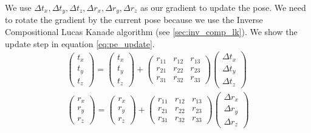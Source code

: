 \documentclass[11pt,a4paper,titlepage,oneside]{report}
\begin{document}
We use $\Delta t_x,\Delta t_y,\Delta t_z,\Delta r_x,\Delta r_y,\Delta r_z$ as our gradient to update the pose. We need to rotate the gradient by the current pose because we use the Inverse Compositional Lucas Kanade algorithm (see \ref{sec:inv_comp_lk}). We show the update step in equation \ref{eq:pe_update}.
\begin{equation}\label{eq:pe_update}
  \begin{gathered}
    \begin{pmatrix}
      t_x\\
      t_y\\
      t_z
    \end{pmatrix}=
    \begin{pmatrix}
      t_x\\
      t_y\\
      t_z
    \end{pmatrix}+
    \begin{pmatrix}
      r_{11} & r_{12} & r_{13}\\
      r_{21} & r_{22} & r_{23}\\
      r_{31} & r_{32} & r_{33}
    \end{pmatrix}
    \begin{pmatrix}
      \Delta t_x\\
      \Delta t_y\\
      \Delta t_z
    \end{pmatrix}\\
    \begin{pmatrix}
      r_x\\
      r_y\\
      r_z
    \end{pmatrix}=
    \begin{pmatrix}
      r_x\\
      r_y\\
      r_z
    \end{pmatrix}+
    \begin{pmatrix}
      r_{11} & r_{12} & r_{13}\\
      r_{21} & r_{22} & r_{23}\\
      r_{31} & r_{32} & r_{33}
    \end{pmatrix}
    \begin{pmatrix}
      \Delta r_x\\
      \Delta r_y\\
      \Delta r_z
    \end{pmatrix}
  \end{gathered}
\end{equation}
\end{document}
